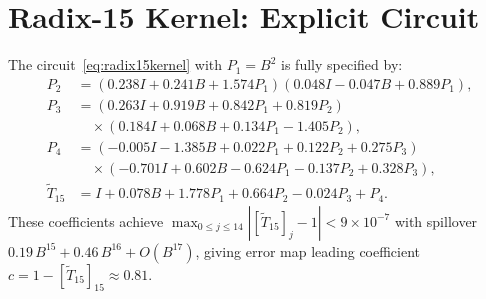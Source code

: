 \documentclass[
  journal=largetwo,
  manuscript=article,
  manuscriptlabel={Research Preprint},
  logo=false,
  simfonts=false,
  year=2026,
  volume=1,
]{cup-journal}
\theoremstyle{definition}
\theoremstyle{remark}
\begin{document}

\section{Radix-15 Kernel: Explicit Circuit}
\label{app:radix15}

The circuit~\eqref{eq:radix15kernel} with $P_1 = B^2$ is fully
specified by:
\begin{align*}
  P_2 &= (0.238I + 0.241B + 1.574P_1)
         (0.048I - 0.047B + 0.889P_1), \\
  P_3 &= (0.263I + 0.919B + 0.842P_1 + 0.819P_2) \\
      &\quad \times
         (0.184I + 0.068B + 0.134P_1 - 1.405P_2), \\
  P_4 &= (-0.005I - 1.385B + 0.022P_1
         + 0.122P_2 + 0.275P_3) \\
      &\quad \times
         (-0.701I + 0.602B - 0.624P_1
         - 0.137P_2 + 0.328P_3), \\
  \widetilde{T}_{15} &= I + 0.078B + 1.778P_1
    + 0.664P_2 - 0.024P_3 + P_4.
\end{align*}
These coefficients achieve
$\max_{0 \leq j \leq 14}|[\widetilde{T}_{15}]_j - 1|
  < 9 \times 10^{-7}$
with spillover $0.19\,B^{15} + 0.46\,B^{16} + O(B^{17})$,
giving error map leading coefficient
$c = 1 - [\widetilde{T}_{15}]_{15} \approx 0.81$.
\end{document}
